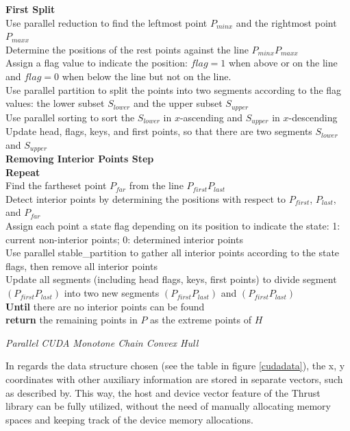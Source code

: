 \documentclass{article}
\begin{document}
\begin{algorithm}[H]
\SetAlgoLined
{}
\textbf{First Split}\\
Use parallel reduction to find the leftmost point $P_{minx}$ and the rightmost point $P_{maxx}$\\
Determine the positions of the rest points against the line $P_{minx}P_{maxx}$\\
Assign a flag value to indicate the position: $flag =1$ when above or on the line and $flag=0$ when below the line but not on the line. \\
Use parallel partition to split the points into two segments according to the flag values: the lower subset $S_{lower}$ and the upper subset $S_{upper}$\\
Use parallel sorting to sort the $S_{lower}$ in $x$-ascending and $S_{upper}$ in $x$-descending\\
Update head, flags, keys, and first points, so that there are two segments $S_{lower}$ and $S_{upper}$\\
\textbf{Removing Interior Points Step}\\
\textbf{Repeat}\\
 {
  Find the fartheset point $P_{far}$ from the line $P_{first}P_{last}$\\
  Detect interior points by determining the positions with respect to $P_{first}$, $P_{last}$, and $P_{far}$ \\
  Assign each point a state flag depending on its position to indicate the state: 1: current non-interior points; 0: determined interior points\\
  Use parallel stable\_partition to gather all interior points according to the state flags, then remove all interior points\\
  Update all segments (including head flags, keys, first points) to divide segment $(P_{first}P_{last})$ into two new segments $(P_{first}P_{last})$ and $(P_{first}P_{last})$\\
}
\textbf{Until} there are no interior points can be found\\
\textbf{return} the remaining points in $P$ as the extreme points of $H$
\caption{\textit{Parallel CUDA Monotone Chain Convex Hull}}
\label{cudahull}
\end{algorithm}
In regards the data structure chosen (see the table in figure \ref{cudadata}), the x, y coordinates with other auxiliary information are stored in separate vectors, such as described by\cite{zhang2015novel}. This way, the host and device vector feature of the Thrust library can be fully utilized, without the need of manually allocating memory spaces and keeping track of the device memory allocations. 
\end{document}
